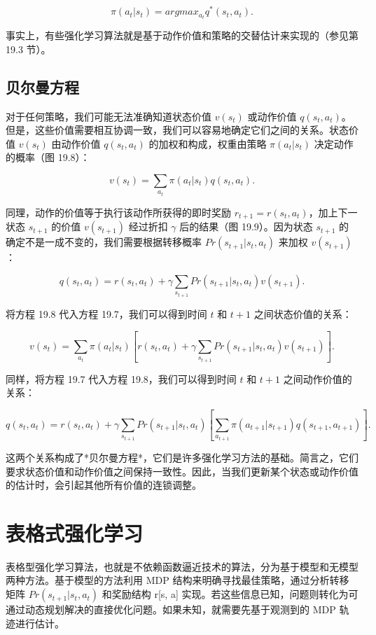 \[
\pi(a_t|s_t) = argmax_{a_t} q^*(s_t, a_t). \tag{19.6}
\]

事实上，有些强化学习算法就是基于动作价值和策略的交替估计来实现的（参见第 19.3 节）。

\subsection{贝尔曼方程}
对于任何策略，我们可能无法准确知道状态价值 \(v(s_t)\) 或动作价值 \(q(s_t, a_t)\)。但是，这些价值需要相互协调一致，我们可以容易地确定它们之间的关系。状态价值 \(v(s_t)\) 由动作价值 \(q(s_t, a_t)\) 的加权和构成，权重由策略 \(\pi(a_t|s_t)\) 决定动作的概率（图 19.8）：

\[
v(s_t) = \sum_{a_t} \pi(a_t|s_t)q(s_t, a_t). \tag{19.7}
\]

同理，动作的价值等于执行该动作所获得的即时奖励 \(r_{t+1} = r(s_t, a_t)\)，加上下一状态 \(s_{t+1}\) 的价值 \(v(s_{t+1})\) 经过折扣 \(\gamma\) 后的结果（图 19.9）。因为状态 \(s_{t+1}\) 的确定不是一成不变的，我们需要根据转移概率 \(Pr(s_{t+1}|s_t, a_t)\) 来加权 \(v(s_{t+1})\)：

\[
q(s_t, a_t) = r(s_t, a_t) + \gamma \sum_{s_{t+1}} Pr(s_{t+1}|s_t, a_t)v(s_{t+1}). \tag{19.8}
\]

将方程 19.8 代入方程 19.7，我们可以得到时间 \(t\) 和 \(t + 1\) 之间状态价值的关系：

\[
v(s_t) = \sum_{a_t} \pi(a_t|s_t) \left[ r(s_t, a_t) + \gamma \sum_{s_{t+1}} Pr(s_{t+1}|s_t, a_t)v(s_{t+1}) \right].  \tag{19.9}
\]

同样，将方程 19.7 代入方程 19.8，我们可以得到时间 \(t\) 和 \(t + 1\) 之间动作价值的关系：

\[
q(s_t, a_t) = r(s_t, a_t) + \gamma \sum_{s_{t+1}} Pr(s_{t+1}|s_t, a_t) \left[ \sum_{a_{t+1}} \pi(a_{t+1}|s_{t+1})q(s_{t+1}, a_{t+1}) \right].  \tag{19.10}
\]

这两个关系构成了*贝尔曼方程*，它们是许多强化学习方法的基础。简言之，它们要求状态价值和动作价值之间保持一致性。因此，当我们更新某个状态或动作价值的估计时，会引起其他所有价值的连锁调整。

\section{表格式强化学习}
表格型强化学习算法，也就是不依赖函数逼近技术的算法，分为基于模型和无模型两种方法。基于模型的方法利用 MDP 结构来明确寻找最佳策略，通过分析转移矩阵 \(Pr(s_{t+1}|s_t,a_t)\) 和奖励结构 r[s, a] 实现。若这些信息已知，问题则转化为可通过动态规划解决的直接优化问题。如果未知，就需要先基于观测到的 MDP 轨迹进行估计。

